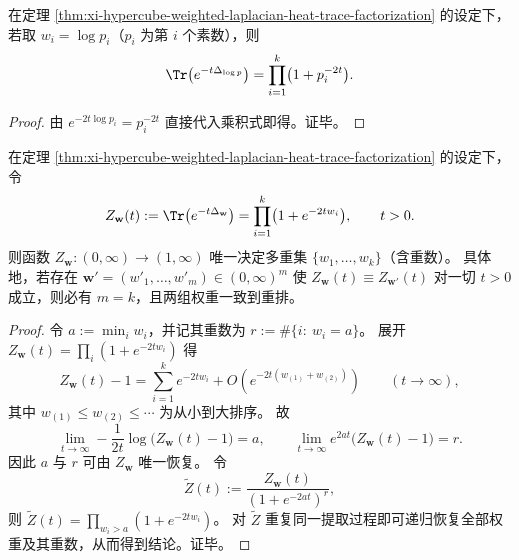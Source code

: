\begin{corollary}[素数对数权的欧拉型热迹]\label{cor:xi-prime-log-weighted-hypercube-heat-trace-euler}
在定理 \ref{thm:xi-hypercube-weighted-laplacian-heat-trace-factorization} 的设定下，若取 \(w_i=\log p_i\)（\(p_i\) 为第 \(i\) 个素数），则
\[
\Tr\bigl(e^{-t\Delta_{\log p}}\bigr)=\prod_{i=1}^{k}\bigl(1+p_i^{-2t}\bigr).
\]
\end{corollary}
\begin{proof}
由 \(e^{-2t\log p_i}=p_i^{-2t}\) 直接代入乘积式即得。证毕。
\end{proof}

\begin{theorem}\label{thm:xi-hypercube-heat-trace-weight-rigidity}
在定理 \ref{thm:xi-hypercube-weighted-laplacian-heat-trace-factorization} 的设定下，令
\[
Z_{\mathbf w}(t):=\Tr\bigl(e^{-t\Delta_{\mathbf w}}\bigr)=\prod_{i=1}^{k}\bigl(1+e^{-2tw_i}\bigr),\qquad t>0.
\]
则函数 \(Z_{\mathbf w}:(0,\infty)\to(1,\infty)\) 唯一决定多重集 \(\{w_1,\dots,w_k\}\)（含重数）。
具体地，若存在 \(\mathbf w'=(w'_1,\dots,w'_m)\in(0,\infty)^m\) 使 \(Z_{\mathbf w}(t)\equiv Z_{\mathbf w'}(t)\) 对一切 \(t>0\) 成立，则必有 \(m=k\)，且两组权重一致到重排。
\end{theorem}
\begin{proof}
令 \(a:=\min_i w_i\)，并记其重数为 \(r:=\#\{i:\ w_i=a\}\)。
展开
\(
Z_{\mathbf w}(t)=\prod_i(1+e^{-2tw_i})
\)
得
\[
Z_{\mathbf w}(t)-1=\sum_{i=1}^{k}e^{-2tw_i}+O\!\left(e^{-2t(w_{(1)}+w_{(2)})}\right)\qquad(t\to\infty),
\]
其中 \(w_{(1)}\le w_{(2)}\le\cdots\) 为从小到大排序。
故
\[
\lim_{t\to\infty}-\frac{1}{2t}\log\bigl(Z_{\mathbf w}(t)-1\bigr)=a,
\qquad
\lim_{t\to\infty}e^{2at}\bigl(Z_{\mathbf w}(t)-1\bigr)=r.
\]
因此 \(a\) 与 \(r\) 可由 \(Z_{\mathbf w}\) 唯一恢复。
令
\[
\widetilde Z(t):=\frac{Z_{\mathbf w}(t)}{(1+e^{-2at})^{r}},
\]
则 \(\widetilde Z(t)=\prod_{w_i>a}(1+e^{-2tw_i})\)。
对 \(\widetilde Z\) 重复同一提取过程即可递归恢复全部权重及其重数，从而得到结论。证毕。
\end{proof}

